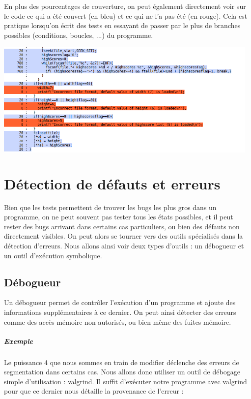 \documentclass{report}
\begin{document}
En plus des pourcentages de couverture, on peut également directement voir sur le code ce qui a été couvert (en bleu) et ce qui ne l'a pas été (en rouge). Cela est pratique lorsqu'on écrit des tests en essayant de passer par le plus de branches possibles (conditions, boucles, ...) du programme.

\begin{center}
  \includegraphics[width=13cm]{couverture2.png}
\end{center}

\chapter{Détection de défauts et erreurs}
Bien que les tests permettent de trouver les bugs les plus gros dans un programme, on ne peut souvent pas tester tous les états possibles, et il peut rester des bugs arrivant dans certains cas particuliers, ou bien des défauts non directement visibles. On peut alors se tourner vers des outils spécialisés dans la détection d'erreurs. Nous allons ainsi voir deux types d'outils : un débogueur et un outil d'exécution symbolique.
\section{Débogueur}
Un débogueur permet de contrôler l'exécution d'un programme et ajoute des informations supplémentaires à ce dernier. On peut ainsi détecter des erreurs comme des accès mémoire non autorisés, ou bien même des fuites mémoire.
\paragraph{Exemple}
Le puissance 4 que nous sommes en train de modifier déclenche des erreurs de segmentation dans certains cas. Nous allons donc utiliser un outil de débogage simple d'utilisation : valgrind. Il suffit d'exécuter notre programme avec valgrind pour que ce dernier nous détaille la provenance de l'erreur :
\end{document}

